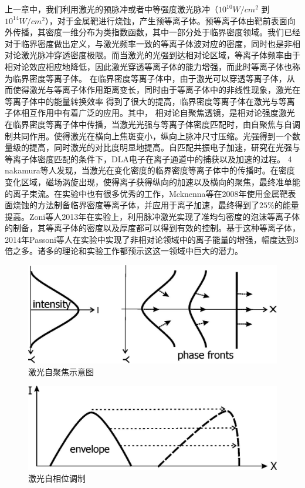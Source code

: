 上一章中，我们利用激光的预脉冲或者中等强度激光脉冲（$10^{10}W/cm^2$ 到 $10^{14}W/cm^2$），对于金属靶进行烧蚀，产生预等离子体。预等离子体由靶前表面向外传播，其密度一维分布为类指数函数，其中一部分处于临界密度领域。我们已经对于临界密度做出定义，与激光频率一致的等离子体波对应的密度，同时也是非相对论激光脉冲穿透密度极限。而当激光的光强到达相对论区域，等离子体频率由于相对论效应相应地降低，因此激光穿透等离子体的能力增强，而此时等离子体也称为临界密度等离子体。
在临界密度等离子体中，由于激光可以穿透等离子体，从而使得激光与等离子体作用距离变长，同时由于等离子体中的非线性现象，激光在等离子体中的能量转换效率 得到了很大的提高，临界密度等离子体在激光与等离子体相互作用中有着广泛的应用。其中， 相对论自聚焦透镜，是相对论强度激光在临界密度等离子体中传播，当激光光强与等离子体密度匹配时，由自聚焦与自调制共同作用。使得激光在横向上焦斑变小，纵向上脉冲尺寸压缩。光强得到一个数量级的提高，同时激光的对比度明显地提高。自匹配共振电子加速，研究在光强与等离子体密度匹配的条件下，DLA电子在离子通道中的捕获以及加速的过程。 4 nakamura等人发现，当激光在变化密度的临界密度等离子体中的传播时。在密度变化区域，磁场涡旋出现，使得离子获得纵向的加速以及横向的聚焦，最终准单能的离子束流。在实验中也有很多优秀的工作，Mcknenna等在2008年使用金属靶表面烧蚀的方法制备临界密度等离子体，并应用于离子加速，最终得到了$25 \%$的能量提高。Zoni等人2013年在实验上，利用脉冲激光实现了准均匀密度的泡沫等离子体的制备，其等离子体的密度以及厚度都可以得到有效的控制。基于这种等离子体，2014年Passoni等人在实验中实现了非相对论领域中的离子能量的增强，幅度达到3倍之多。诸多的理论和实验工作都预示这这一领域中巨大的潜力。

\begin{figure}[!htbp]
  \centering
  \includegraphics[width=\MyFactor\textwidth]{Img/selffocussing.eps}
  \caption{激光自聚焦示意图}
  \label{fig:selffousing}
\end{figure}

\begin{figure}[!htbp]
  \centering
  \includegraphics[width=\MyFactor\textwidth]{Img/prof-steepening.eps}
  \caption{激光自相位调制}
  \label{fig:phaseModulate}
\end{figure}




